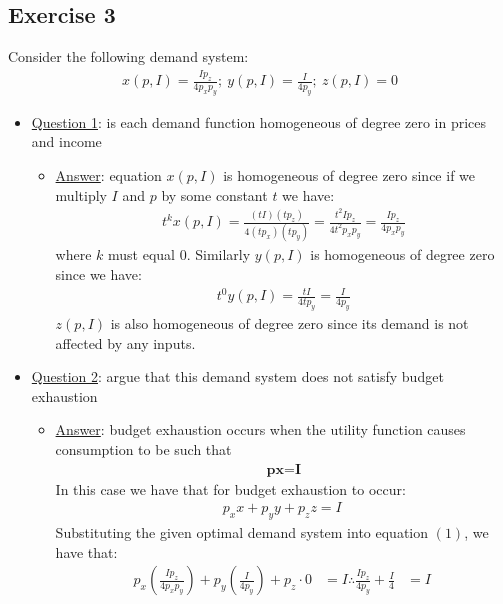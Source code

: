\documentclass{article}
\begin{document}
\subsection{Exercise 3}
Consider the following demand system:
\begin{gather*}
  x(p,I) = \frac{Ip_{z}}{4p_{x}p_{y}}; \ y(p,I) = \frac{I}{4p_{y}}; \ z(p,I) = 0
\end{gather*}
\par \vspace{0.3em}
\begin{itemize}
  \item  \underline{Question 1}: is each demand function homogeneous of degree zero in prices and income
  \begin{itemize}
    \item  \underline{Answer}: equation $x(p,I)$ is homogeneous of degree zero since if we multiply $I$ and $p$ by some constant $t$ we have:
    \begin{gather*}
        t^{k}x(p,I) = \frac{(tI)(tp_{z})}{4(tp_{x})(tp_{y})} = \frac{t^{2}Ip_{z}}{4t^{2}p_{x}p_{y}} = \frac{Ip_{z}}{4p_{x}p_{y}}
    \end{gather*}
    where $k$ must equal 0. Similarly $y(p,I)$ is homogeneous of degree zero since we have:
    \begin{gather*}
      t^{0}y(p,I) = \frac{tI}{4tp_{y}} = \frac{I}{4p_{y}}
    \end{gather*}
    $z(p,I)$ is also homogeneous of degree zero since its demand is not affected by any inputs.
  \end{itemize}
  \item  \underline{Question 2}: argue that this demand system does not satisfy budget exhaustion
  \begin{itemize}
    \item  \underline{Answer}: budget exhaustion occurs when the utility function causes consumption to be such that
    \begin{gather*}
      \textbf{p}\textbf{x} = \textbf{I}
    \end{gather*}
    In this case we have that for budget exhaustion to occur:
    \begin{gather*}
      p_{x}x + p_{y}y + p_{z}z = I \ \tag{1}
    \end{gather*}
    Substituting the given optimal demand system into equation $(1)$, we have that:
    \begin{align*}
      p_{x}(\frac{Ip_{z}}{4p_{x}p_{y}}) + p_{y}(\frac{I}{4p_{y}}) + p_{z} \cdot 0 &= I
      \therefore \frac{Ip_{z}}{4p_{y}} + \frac{I}{4} &= I \ \tag{2}

\end{align*}
\end{itemize}
\end{itemize}
\end{document}

